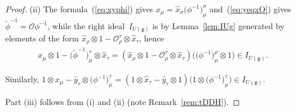 \documentclass[10pt,a4paper]{amsart}
\def\gg{\mathfrak{g}}
\def\OO{\mathcal{O}}
\numberwithin{equation}{section}
\begin{document}
\begin{proof}
(ii) The formula~(\ref{eq:xyphi}) gives $x_\mu = \hat{x}_\sigma \big(\phi^{-1}\big)^\sigma_\mu$ and~(\ref{eq:yeqxO}) gives $\tilde\phi^{-1} = \mathcal{O}\phi^{-1}$, while the right ideal~$I_{U(\gg)}$ is by Lemma~\ref{lem:IUg} generated by elements of the form $\hat{x}_\rho\otimes 1 - \mathcal{O}^\tau_\rho\otimes\hat{x}_\tau$, hence
\begin{gather*}
x_\mu\otimes 1 - \big(\tilde\phi^{-1}\big)^\tau_\mu\otimes\hat{x}_\tau = (\hat{x}_\rho\otimes 1 - \OO^\tau_\rho\otimes\hat{x}_\tau)\big(\big(\phi^{-1}\big)^\rho_\mu\otimes 1\big)\in I_{U(\gg)}.\end{gather*}

Similarly, $1\otimes x_\mu - \hat{y}_\tau\otimes\big(\phi^{-1}\big)^\tau_\mu = (1\otimes \hat{x}_\tau - \hat{y}_\tau\otimes 1)\big(1\otimes\big(\phi^{-1}\big)^\tau_\mu\big)\in I_{U(\gg)}$.

Part (iii) follows from (i) and (ii) (note Remark~\ref{rem:tDDH}).
\end{proof}
\end{document}

